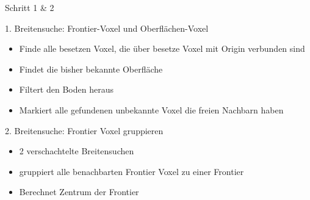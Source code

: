 \documentclass{beamer}
\begin{document}
\begin{frame}{Schritt 1 \& 2}

	\begin{block}{1. Breitensuche: Frontier-Voxel und Oberflächen-Voxel}
		\begin{itemize}
			\item Finde alle besetzen Voxel, die über besetze Voxel mit Origin verbunden sind
			\item Findet die bisher bekannte Oberfläche
			\item Filtert den Boden heraus
			\item Markiert alle gefundenen unbekannte Voxel die freien Nachbarn haben
		\end{itemize}
	\end{block}
	\begin{exampleblock}{2. Breitensuche: Frontier Voxel gruppieren}
		\begin{itemize}
			\item 2 verschachtelte Breitensuchen
			\item gruppiert alle benachbarten Frontier Voxel zu einer Frontier
			\item Berechnet Zentrum der Frontier
		\end{itemize}
	\end{exampleblock}
\end{frame}
\end{document}
